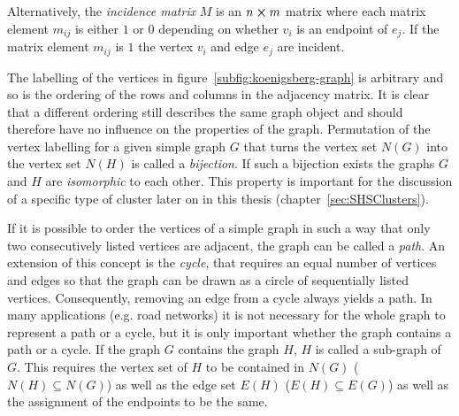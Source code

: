 Alternatively, the \textit{incidence matrix} $M$ is an $n \cross m$ matrix where
each matrix element $m_{ij}$ is either $1$ or $0$ depending on whether $v_i$ is
an endpoint of $e_j$. If the matrix element $m_{ij}$ is $1$ the vertex $v_i$ and
edge $e_j$ are incident.

The labelling of the vertices in figure~\ref{subfig:koenigsberg-graph} is
arbitrary and so is the ordering of the rows and columns in the adjacency
matrix. It is clear that a different ordering still describes the same graph
object and should therefore have no influence on the properties of the graph.
Permutation of the vertex labelling for a given simple graph $G$ that turns the
vertex set $N(G)$ into the vertex set $N(H)$ is called a \textit{bijection}. If
such a bijection exists the graphs $G$ and $H$ are \emph{isomorphic} to each
other. This property is important for the discussion of a specific type of
cluster later on in this thesis (chapter~\ref{sec:SHSClusters}).

If it is possible to order the vertices of a simple graph in such a way that
only two consecutively listed vertices are adjacent, the graph can be called a
\textit{path}. An extension of this concept is the \textit{cycle}, that requires
an equal number of vertices and edges so that the graph can be drawn as a circle
of sequentially listed vertices. Consequently, removing an edge from a cycle
always yields a path. In many applications (e.g. road networks) it is not
necessary for the whole graph to represent a path or a cycle, but it is only
important whether the graph contains a path or a cycle. If the graph $G$
contains the graph $H$, $H$ is called a sub-graph of $G$. This requires the
vertex set of $H$ to be contained in $N(G)$ ($N(H)\subseteq N(G)$) as well as
the edge set $E(H)$ ($E(H)\subseteq E(G)$) as well as the assignment of the
endpoints to be the same.


